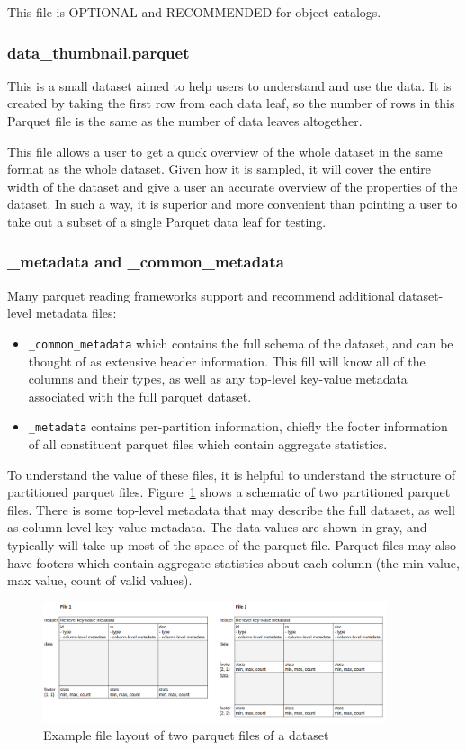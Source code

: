 \documentclass[11pt,a4paper]{ivoa}
\begin{document}
This file is OPTIONAL and RECOMMENDED for object catalogs.
           \subsubsection{data\_thumbnail.parquet} 
  This is a small dataset aimed to help users to understand and use the data. It is created by taking the first row from each data leaf, so the number of rows in this Parquet file is the same as the number of data leaves altogether. \par
  This file allows a user to get a quick overview of the whole dataset in the same format as the whole dataset. Given how it is sampled, it will cover the entire width of the dataset and give a user an accurate overview of the properties of the dataset. In such a way, it is superior and more convenient than pointing a user to take out a subset of a single Parquet data leaf for testing. 
    
        \subsubsection{\_metadata and \_common\_metadata} 

   Many parquet reading frameworks support and recommend additional dataset-level metadata files:
   \begin{itemize}
    \item \texttt{\_common\_metadata} which contains the full schema of the dataset, and can be thought of as extensive header information. This fill will know all of the columns and their types, as well as any top-level key-value metadata associated with the full parquet dataset.
    \item \texttt{\_metadata} contains per-partition information, chiefly the footer information of all constituent parquet files which contain aggregate statistics.
\end{itemize}

To understand the value of these files, it is helpful to understand the structure of partitioned parquet files. 
Figure~\ref{fig:partitionedParquet} shows a schematic of two partitioned parquet files. There is some top-level metadata that may describe the full dataset, as well as column-level key-value metadata.
The data values are shown in gray, and typically will take up most of the space of the parquet file. Parquet files may also have footers which contain aggregate statistics about each column (the min value, max value, count of valid values).
\begin{figure}
\centering
\includegraphics[width=0.9\textwidth]{leaf_files.png}
\caption{Example file layout of two parquet files of a dataset}
\label{fig:partitionedParquet}
\end{figure}
\end{document}
